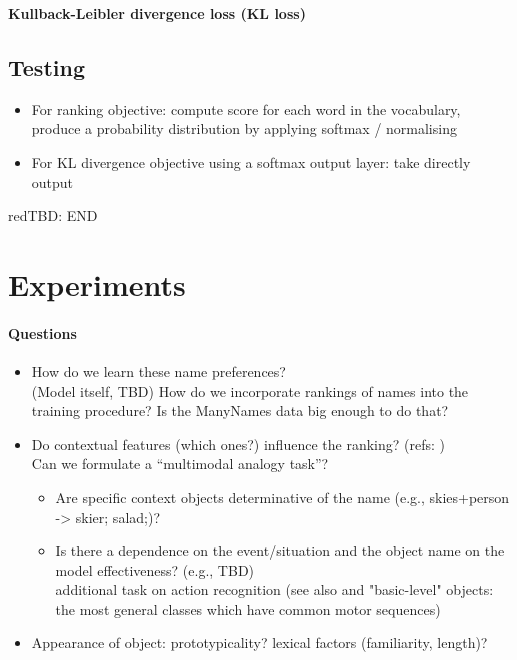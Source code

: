 \documentclass[11pt,a4paper]{article}
\newcommand{\tbd}[1]{\begin{color}{red}TBD: #1\end{color}\xspace}
\begin{document}
\textbf{Kullback-Leibler divergence loss (KL loss)}\\

\subsection{Testing}
\begin{itemize}
	\item For ranking objective: compute score for each word in the vocabulary, produce a probability distribution by applying softmax / normalising
	\item For KL divergence objective using a softmax output layer: take directly  output
\end{itemize}
\tbd{END}

\section{Experiments}
\label{sec:experiments}

\paragraph{Questions}
\begin{itemize}
	\item How do we learn these  name preferences?\\
	 (Model itself, TBD) How do we incorporate rankings of names into the training procedure? Is the ManyNames data big enough to do that?
	\item Do contextual features (which ones?) influence the ranking? (refs: \citealp{murphy1989categorizing})\\
	Can we formulate a ``multimodal analogy task''?
	\begin{itemize}
		\item Are specific context objects determinative of the name (e.g., skies+person -> skier; salad;)?
		\item Is there a dependence on the event/situation and the object name on the model effectiveness?  (e.g., TBD)\\
		additional task on action recognition (see also  and "basic-level" objects: the most general classes which have common motor sequences)
	\end{itemize}
	\item Appearance of object: prototypicality? lexical factors (familiarity, length)?
\end{itemize}
\end{document}
